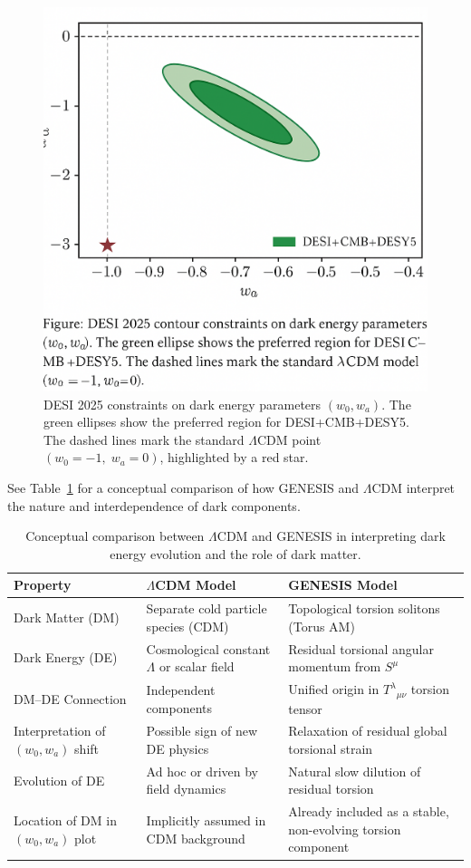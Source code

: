 \documentclass{article}
\begin{document}
\begin{figure}[h!]
  \centering
  \includegraphics[width=0.65\linewidth]{desi_contour_clean.png}
  \caption{DESI 2025 constraints on dark energy parameters $(w_0, w_a)$. The green ellipses show the preferred region for DESI+CMB+DESY5. The dashed lines mark the standard $\Lambda$CDM point $(w_0 = -1,\;w_a = 0)$, highlighted by a red star.}
  \label{fig:desi-contour}
\end{figure}

See Table~\ref{tab:LCDM-vs-GENESIS} for a conceptual comparison of how GENESIS and $\Lambda$CDM interpret the nature and interdependence of dark components.

\begin{table}[h!]
\centering
\renewcommand{\arraystretch}{1.3}
\begin{tabular}{|p{4.5cm}|p{5.5cm}|p{5.5cm}|}
\hline
\textbf{Property} & \textbf{\(\Lambda\)CDM Model} & \textbf{GENESIS Model} \\
\hline
Dark Matter (DM) &
Separate cold particle species (CDM) &
Topological torsion solitons (Torus AM) \\
\hline
Dark Energy (DE) &
Cosmological constant $\Lambda$ or scalar field &
Residual torsional angular momentum from $S^\mu$ \\
\hline
DM–DE Connection &
Independent components &
Unified origin in $T^\lambda{}_{\mu\nu}$ torsion tensor \\
\hline
Interpretation of $(w_0, w_a)$ shift &
Possible sign of new DE physics &
Relaxation of residual global torsional strain \\
\hline
Evolution of DE &
Ad hoc or driven by field dynamics &
Natural slow dilution of residual torsion \\
\hline
Location of DM in $(w_0,w_a)$ plot &
Implicitly assumed in CDM background &
Already included as a stable, non-evolving torsion component \\
\hline
\end{tabular}
\caption{Conceptual comparison between $\Lambda$CDM and GENESIS in interpreting dark energy evolution and the role of dark matter.}
\label{tab:LCDM-vs-GENESIS}
\end{table}
\end{document}
